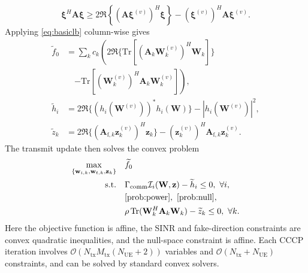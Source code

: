 \documentclass[lettersize,journal]{IEEEtran}
\begin{document}
\begin{equation}
\boldsymbol{\xi}^H\mathbf{A}\boldsymbol{\xi}\ge 2\Re\!\left\{(\mathbf{A}\boldsymbol{\xi}^{(v)})^H\boldsymbol{\xi}\right\}-(\boldsymbol{\xi}^{(v)})^H\mathbf{A}\boldsymbol{\xi}^{(v)}.
\label{eq:basiclb}
\end{equation}
Applying \eqref{eq:basiclb} column-wise gives
\begin{equation}
    \begin{aligned}
    \widetilde f_0&={\textstyle\sum_k} c_k\!\left(2\Re\{\mathrm{Tr}[(\mathbf{A}_k\mathbf{W}_k^{(v)})^H\mathbf{W}_k]\}\right. \nonumber\\
    &\quad\left.-\mathrm{Tr}[(\mathbf{W}_k^{(v)})^H\mathbf{A}_k\mathbf{W}_k^{(v)}]\right),\\
    \widetilde h_i&=2\Re\{(h_i(\mathbf{W}^{(v)}))^*h_i(\mathbf{W})\}-|h_i(\mathbf{W}^{(v)})|^2,\\
    \widetilde z_k&=2\Re\{(\mathbf{A}_{\mathrm{f},k}\mathbf{z}_k^{(v)})^H\mathbf{z}_k\}
    -(\mathbf{z}_k^{(v)})^H\mathbf{A}_{\mathrm{f},k}\mathbf{z}_k^{(v)} .
    \end{aligned}
    \label{eq:cccp-lb}
\end{equation}
The transmit update then solves the convex problem
\begin{subequations}\label{eq:tx-cvx}
\begin{align}
\max_{\{\mathbf{w}_{i,k},\mathbf{w}_{t,k},\mathbf{z}_k\}}\quad & \widetilde f_0\\
\text{s.t.}\quad & \Gamma_{\mathrm{comm}}\mathcal{I}_i(\mathbf{W},\mathbf{z})-\widetilde h_i\le 0,\ \forall i,\\
& \eqref{prob:power},\ \eqref{prob:null},\\
& \rho\,\mathrm{Tr}(\mathbf{W}_k^H\mathbf{A}_k\mathbf{W}_k)-\widetilde z_k\le 0,\ \forall k.
\end{align}
\end{subequations}
Here the objective function is affine, the SINR and fake-direction constraints are convex quadratic inequalities, and the null-space constraint is affine. Each CCCP iteration involves $\mathcal{O}(N_{\mathrm{tx}}M_{\mathrm{tx}}(N_{\mathrm{UE}}{+}2))$ variables and $\mathcal{O}(N_{\mathrm{tx}}{+}N_{\mathrm{UE}})$ constraints, and can be solved by standard convex solvers.
\end{document}
